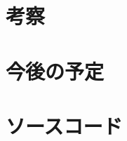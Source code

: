 \documentclass[twocolumn]{jarticle}     %
\begin{document}
%

\section{考察}

\section{今後の予定}


\section{ソースコード}




\end{document}
